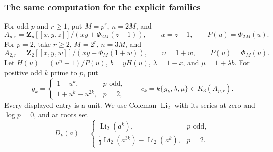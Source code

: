 \documentclass[11pt,a4paper]{article}
\theoremstyle{remark}
\begin{document}
\subsubsection{The same computation for the explicit families}

For odd $p$ and $r\ge1$, put $M=p^r$, $n=2M$, and
\[
 A_{p,r}=\mathbf Z_p[[x,y,z]]/(xy+\Phi_{2M}(z-1)),
 \qquad u=z-1,\qquad P(u)=\Phi_{2M}(u).
\]
For $p=2$, take $r\ge2$, $M=2^r$, $n=3M$, and
\[
 A_{2,r}=\mathbf Z_2[[x,y,w]]/(xy+\Phi_M(1+w)),
 \qquad u=1+w,\qquad P(u)=\Phi_M(u).
\]
Let $H(u)=(u^n-1)/P(u)$, $b=yH(u)$,
$\lambda=1-x$, and $\mu=1+\lambda b$. For positive odd $k$ prime
to $p$, put
\[
 g_k=\begin{cases}1-u^k,&p\text{ odd},\\
                  1+u^k+u^{2k},&p=2,
       \end{cases}
 \qquad c_k=k\{g_k,\lambda,\mu\}\in K_3(A_{p,r}).
\]
Every displayed entry is a unit. We use Coleman $\operatorname{Li}_2$
with its series at zero and $\log p=0$, and at roots set
\[
 D_k(a)=\begin{cases}
       \operatorname{Li}_2(a^k),&p\text{ odd},\\
       \tfrac13\operatorname{Li}_2(a^{3k})-
                        \operatorname{Li}_2(a^k),&p=2.
       \end{cases}
\]
\end{document}
